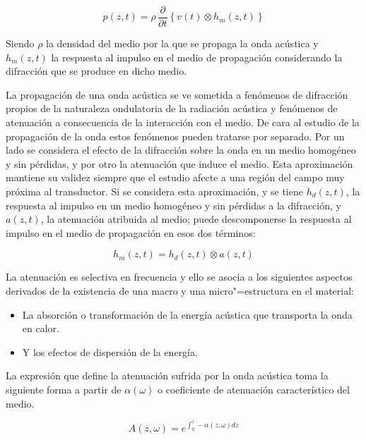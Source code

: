 \begin{equation}
	p(z, t) = \rho\,\frac{\partial}{\partial t}\left\{v(t)\otimes
	h_{m}(z, t)\right\}
	\label{eq:diffracpressure}
\end{equation}

Siendo $\rho$ la densidad del medio por la que se propaga la onda acústica
y $h_{m}(z, t)$ la respuesta al impulso en el medio de propagación
considerando la difracción que se produce en dicho medio.

La propagación de una onda acústica se ve sometida a fenómenos de
difracción propios de la naturaleza ondulatoria de la radiación acústica y
fenómenos de atenuación a consecuencia de la interacción con el medio. De
cara al estudio de la propagación de la onda estos fenómenos pueden
tratarse por separado. Por un lado se considera el efecto de la difracción
sobre la onda en un medio homogéneo y sin pérdidas, y por otro la
atenuación que induce el medio. Esta aproximación mantiene su validez
siempre que el estudio afecte a una región del campo muy próxima al
transductor. Si se considera esta aproximación, y se tiene $h_d(z, t)$, la
respuesta al impulso en un medio homogéneo y sin pérdidas a la difracción,
y $a(z, t)$, la atenuación atribuida al medio; puede descomponerse la
respuesta al impulso en el medio de propagación en esos dos términos:

\begin{equation}
	h_m(z, t) = h_d(z, t)\otimes a(z, t)
	\label{eq:diffraction}
\end{equation}

La atenuación es selectiva en frecuencia y ello se asocia a los siguientes
aspectos derivados de la existencia de una macro y una micro"=estructura en
el material:

\begin{itemize}
	\item La absorción o transformación de la energía acústica que
		transporta la onda en calor.
	\item Y los efectos de dispersión de la energía.
\end{itemize}

La expresión que define la atenuación sufrida por la onda acústica toma la
siguiente forma a partir de $\alpha(\omega)$ o coeficiente de atenuación
característico del medio.

\begin{equation}
	A(z, \omega) = e^{\int^z_0 -\alpha(z, \omega)dz} 
	\label{eq:loss}
\end{equation}

